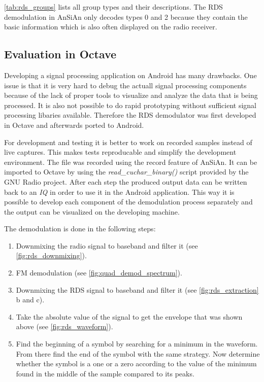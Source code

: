 \autoref{tab:rds_groups} lists all group types and their descriptions.
The \ac{RDS} demodulation in AnSiAn only decodes types 0 and 2 because they contain
the basic information which is also often displayed on the radio
receiver.


\subsection{Evaluation in Octave}

Developing a signal processing application on Android has many drawbacks. One
issue is that it is very hard to debug the actuall signal processing components
because of the lack of proper tools to visualize and analyze the data that is
being processed. It is also not possible to do rapid prototyping without
sufficient signal processing libaries available. Therefore the \ac{RDS}
demodulator was first developed in Octave and afterwards ported to Android.

For development and testing it is better to work on recorded samples instead
of live captures. This makes tests reproducable and simplify the development
environment. The file was recorded using the record feature of AnSiAn. It
can be imported to Octave by using the \emph{read\_cuchar\_binary()} script
provided by the GNU Radio project. After each step the produced output data
can be written back to an \emph{IQ} in order to use it in the Android application.
This way it is possible to develop each component of the demodulation process
separately and the output can be visualized on the developing machine.

The demodulation is done in the following steps:
\begin{enumerate}
	\item Downmixing the radio signal to baseband and filter it (see 
		\autoref{fig:rds_downmixing}).
	\item \ac{FM} demodulation (see \autoref{fig:quad_demod_spectrum}).
	\item Downmixing the \ac{RDS} signal to baseband and filter it
		(see \autoref{fig:rds_extraction} b and c).
	\item Take the absolute value of the signal to get the envelope
		that was shown above (see \autoref{fig:rds_waveform}).
	\item Find the beginning of a symbol by searching for a minimum in
		the waveform. From there find the end of the symbol with the
		same strategy. Now determine whether the symbol is a one or a
		zero according to the value of the minimum found in the middle
		of the sample compared to its peaks.
\end{enumerate}


